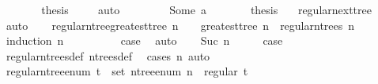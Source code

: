 \begin{isabellebody}
\ \ \ \ \isamarkupfalse%
\ \isamarkupfalse%
\ {\isacharquery}{\kern0pt}thesis\ \isamarkupfalse%
\ {}\ \isamarkupfalse%
\ auto\isanewline
\ \ \isamarkupfalse%
\isanewline
\ \ \ \ \isamarkupfalse%
\ {\isacharparenleft}{\kern0pt}Some\ a{\isacharparenright}{\kern0pt}\isanewline
\ \ \ \ \isamarkupfalse%
\ \isamarkupfalse%
\ {\isacharquery}{\kern0pt}thesis\ \isamarkupfalse%
\ {}\ regular{\isacharunderscore}{\kern0pt}next{\isacharunderscore}{\kern0pt}tree{\isacharprime}{\kern0pt}\ \isamarkupfalse%
\ auto\isanewline
\ \ \isamarkupfalse%
\isanewline
{}\isamarkupfalse%
%
\endisatagproof
{\isafoldproof}%
%
\isadelimproof
\isanewline
%
\endisadelimproof
\isanewline
{}\isamarkupfalse%
\ regular{\isacharunderscore}{\kern0pt}n{\isacharunderscore}{\kern0pt}tree{\isacharunderscore}{\kern0pt}greatest{\isacharunderscore}{\kern0pt}tree{\isacharcolon}{\kern0pt}\ {\isachardoublequoteopen}n\ {\isasymnoteq}\ {}\ {\isasymLongrightarrow}\ greatest{\isacharunderscore}{\kern0pt}tree\ n\ {\isasymin}\ regular{\isacharunderscore}{\kern0pt}n{\isacharunderscore}{\kern0pt}trees\ n{\isachardoublequoteclose}\isanewline
%
\isadelimproof
%
\endisadelimproof
%
\isatagproof
{}\isamarkupfalse%
\ {\isacharparenleft}{\kern0pt}induction\ n{\isacharparenright}{\kern0pt}\isanewline
\ \ \isamarkupfalse%
\ {}\isanewline
\ \ \isamarkupfalse%
\ \isamarkupfalse%
\ {\isacharquery}{\kern0pt}case\ \isamarkupfalse%
\ auto\isanewline
{}\isamarkupfalse%
\isanewline
\ \ \isamarkupfalse%
\ {\isacharparenleft}{\kern0pt}Suc\ n{\isacharparenright}{\kern0pt}\isanewline
\ \ \isamarkupfalse%
\ \isamarkupfalse%
\ {\isacharquery}{\kern0pt}case\ \isamarkupfalse%
\ regular{\isacharunderscore}{\kern0pt}n{\isacharunderscore}{\kern0pt}trees{\isacharunderscore}{\kern0pt}def\ n{\isacharunderscore}{\kern0pt}trees{\isacharunderscore}{\kern0pt}def\ \isamarkupfalse%
\ {\isacharparenleft}{\kern0pt}cases\ n{\isacharparenright}{\kern0pt}\ auto\isanewline
{}\isamarkupfalse%
%
\endisatagproof
{\isafoldproof}%
%
\isadelimproof
\isanewline
%
\endisadelimproof
\isanewline
{}\isamarkupfalse%
\ regular{\isacharunderscore}{\kern0pt}n{\isacharunderscore}{\kern0pt}tree{\isacharunderscore}{\kern0pt}enum{\isacharcolon}{\kern0pt}\ {\isachardoublequoteopen}t\ {\isasymin}\ set\ {\isacharparenleft}{\kern0pt}n{\isacharunderscore}{\kern0pt}tree{\isacharunderscore}{\kern0pt}enum\ n{\isacharparenright}{\kern0pt}\ {\isasymLongrightarrow}\ regular\ t{\isachardoublequoteclose}\isanewline

\end{isabellebody}
